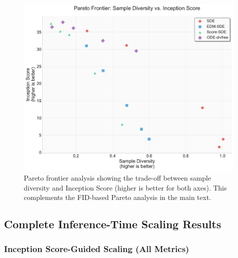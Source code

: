 \documentclass{article}
\begin{document}
\begin{figure}[H]
  \centering
  \includegraphics[width=0.7\linewidth]{figures/pareto_diversity_vs_inception.pdf}
  \caption{Pareto frontier analysis showing the trade-off between sample diversity and Inception Score (higher is better for both axes). This complements the FID-based Pareto analysis in the main text.}
  \label{fig:pareto-inception}
\end{figure}

\subsection{Complete Inference-Time Scaling Results}

\subsubsection{Inception Score-Guided Scaling (All Metrics)}
\end{document}
